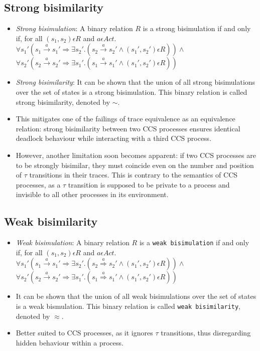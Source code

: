 \documentclass{article}
\begin{document}
\subsection{Strong bisimilarity}
  \begin{itemize}
  \item \emph{Strong bisimulation}: A binary relation $R$ is a strong
    bisimulation if and only if, for all $(s_1, s_2) \epsilon R$ and $a \epsilon Act .$\\
    $\forall s_1' (s_1 \xrightarrow{a} s_1' \Rightarrow \exists s_2'
    . (s_2 \xrightarrow{a} s_2' \wedge (s_1', s_2') \epsilon R ) )
    \wedge $ \\
    $\forall s_2' (s_2 \xrightarrow{a} s_2' \Rightarrow \exists s_1'
    . (s_1 \xrightarrow{a} s_1' \wedge (s_1', s_2') \epsilon R ) )$
  \item \emph{Strong bisimilarity}: It can be shown that the union of
    all strong bisimulations
    over the set of states is a strong bisimulation. This binary
    relation is called strong bisimilarity, denoted by $\sim$.
  \item This mitigates one of the failings of trace equivalence as an
    equivalence relation: strong bisimilarity between two CCS
    processes ensures identical deadlock behaviour while interacting
    with a third CCS process.
  \item However, another limitation soon becomes apparent: if two CCS
    processes are to be strongly bisimilar, they must coincide even on
    the number and position of $\tau$ transitions in their
    traces. This is contrary to the semantics of CCS processes, as
    a $\tau$ transition is supposed to be private to a process and
    invisible to all other processes in its environment.

  \end{itemize}

\subsection{Weak bisimilarity}

  \begin{itemize}
  \item \emph{Weak bisimulation}: A binary relation $R$ is a \texttt{weak
    bisimulation} if and only if, for all $(s_1, s_2) \epsilon R$ and
    $a \epsilon Act .$\\
    $\forall s_1' (s_1 \xrightarrow{a} s_1' \Rightarrow \exists s_2'
    . (s_2 \overset{a}{\Rightarrow} s_2' \wedge (s_1', s_2') \epsilon R ) )
    \wedge $ \\
    $\forall s_2' (s_2 \xrightarrow{a} s_2' \Rightarrow \exists s_1'
    . (s_1 \overset{a}{\Rightarrow} s_1' \wedge (s_1', s_2') \epsilon R ) )$
  \item It can be shown that the union of all weak bisimulations
    over the set of states is a weak bismulation. This binary
    relation is called \texttt{weak bisimilarity}, denoted by $\approx$.
  \item Better suited to CCS processes,
    as it ignores $\tau$ transitions, thus disregarding hidden
    behaviour within a process.
  \end{itemize}
\end{document}
